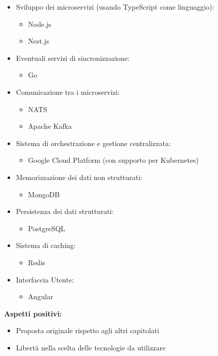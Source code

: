 \documentclass[10pt]{article}
\begin{document}
\begin{itemize}
    \item Sviluppo dei microservizi (usando TypeScript come linguaggio):
    \begin{itemize}
        \item Node.js
        \item Nest.js
    \end{itemize}
    \item Eventuali servizi di sincronizzazione:
    \begin{itemize}
        \item Go
    \end{itemize}
    \item Comunicazione tra i microservizi:
    \begin{itemize}
        \item NATS
        \item Apache Kafka
    \end{itemize}
    \item Sistema di orchestrazione e gestione centralizzata:
    \begin{itemize}
        \item Google Cloud Platform (con supporto per Kubernetes)
    \end{itemize}
    \item Memorizzazione dei dati non strutturati:
    \begin{itemize}
        \item MongoDB
    \end{itemize}
    \item Persistenza dei dati strutturati:
    \begin{itemize}
        \item PostgreSQL
    \end{itemize}
    \item Sistema di caching:
    \begin{itemize}
        \item Redis
    \end{itemize}
    \item Interfaccia Utente:
    \begin{itemize}
        \item Angular
    \end{itemize}
\end{itemize}
\textbf{Aspetti positivi:}
\begin{itemize}
    \item Proposta originale rispetto agli altri capitolati
    \item Libertà nella scelta delle tecnologie da utilizzare
\end{itemize}
\end{document}
